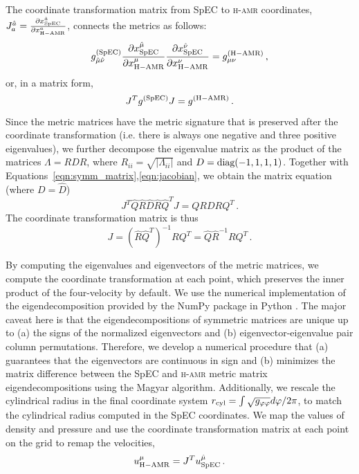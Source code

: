 \documentclass[twocolumn,dvipsnames]{aastex62}
\begin{document}
The coordinate transformation matrix from SpEC to \textsc{h-amr} coordinates, $J^{\hat{a}}_{a} = \frac{\partial x^{\hat{a}}_{\rm SpEC}}{\partial x^a_{\rm H-AMR}}$, connects the metrics as follows:
\begin{equation}
g^{\rm(SpEC)}_{\hat{\mu}\hat{\nu}} \frac{\partial x^{\hat{\mu}}_{\rm SpEC}}{\partial x^\mu_{\rm H-AMR}} \frac{\partial x^{\hat{\nu}}_{\rm SpEC}}{\partial x^\nu_{\rm H-AMR}} = g^{\rm (H-AMR)}_{\mu\nu}\,,
    \label{eqn:gcov_spec2hamr}
\end{equation}
or, in a matrix form,
\begin{equation}
    J^T g^{\rm(SpEC)} J = g^{\rm (H-AMR)}\,.
    \label{eqn:jacobian}
\end{equation}
Since the metric matrices have the metric signature that is preserved after the coordinate transformation (i.e. there is always one negative and three positive eigenvalues), we further decompose the eigenvalue matrix as the product of the matrices $\Lambda = RDR$, where $R_{ii} = \sqrt{|\Lambda_{ii}|}$ and $D=\rm diag (-1,1,1,1)$. 
Together with Equations~\eqref{eqn:symm_matrix},\eqref{eqn:jacobian}, we obtain the matrix equation (where $D = \hat{D}$)
\begin{equation}
    J^T \hat{Q}\hat{R}\hat{D}\hat{R}\hat{Q}^T J = Q R D R Q^T\,.
\end{equation}
The coordinate transformation matrix is thus
\begin{equation}
    J = (\hat{R}\hat{Q}^T)^{-1} R Q^T = \hat{Q} \hat{R}^{-1} R Q^T\,.
\end{equation}

By computing the eigenvalues and eigenvectors of the metric matrices, we compute the coordinate transformation at each point, which preserves the inner product of the four-velocity by default. We use the numerical implementation of the eigendecomposition provided by the NumPy package in Python \citep[specifically, the eigh() function;][]{Harris2020}. The major caveat here is that the eigendecompositions of symmetric matrices are unique up to (a) the signs of the normalized eigenvectors and (b) eigenvector-eigenvalue pair column permutations. Therefore, we develop a numerical procedure that (a) guarantees that the eigenvectors are continuous in sign and (b) minimizes the matrix difference between the SpEC and \textsc{h-amr} metric matrix eigendecompositions using the Magyar algorithm. Additionally, we rescale the cylindrical radius in the final coordinate system $r_{\rm cyl} = \int \sqrt{g_{\varphi\varphi}}d\varphi/2\pi$, to match the cylindrical radius computed in the SpEC coordinates. We map the values of density and pressure and use the coordinate transformation matrix at each point on the grid to remap the velocities,
\begin{equation}
    u^{\mu}_{\rm H-AMR} = J^T u^{\hat{\mu}}_{\rm SpEC}\,.    \label{eqn:velocityremap_spec2hamr}
\end{equation}
\end{document}
